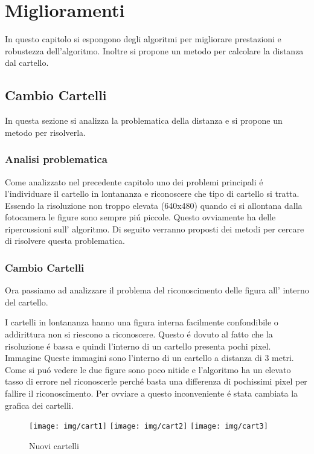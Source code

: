 \chapter{Miglioramenti}

In questo capitolo si espongono degli algoritmi per migliorare prestazioni e robustezza dell'algoritmo. Inoltre si propone un metodo per calcolare la distanza dal cartello.

\section{Cambio Cartelli}

	In questa sezione si analizza la problematica della distanza e si propone un metodo per risolverla.

	\subsection{Analisi problematica}
		Come analizzato nel precedente capitolo uno dei problemi principali \'e l'individuare il cartello in lontananza e riconoscere che tipo di cartello si tratta.
		Essendo la risoluzione non troppo elevata (640x480) quando ci si allontana dalla fotocamera le figure sono sempre pi\'u piccole. Questo ovviamente ha delle ripercussioni sull' algoritmo.
		Di seguito verranno proposti dei metodi per cercare di risolvere questa problematica.


	\subsection{Cambio Cartelli}
		Ora passiamo ad analizzare il problema del riconoscimento delle figura all' interno del cartello.

		I cartelli in lontananza hanno una figura interna facilmente confondibile o addirittura non si riescono a riconoscere. Questo \'e dovuto al fatto che la risoluzione \'e bassa e quindi l'interno di un cartello presenta pochi pixel.
		Immagine
		Queste immagini sono l'interno di un cartello a distanza di 3 metri. Come si pu\'o vedere le due figure sono poco nitide e l'algoritmo ha un elevato tasso di errore nel riconoscerle perch\'e basta una differenza di pochissimi pixel per fallire il riconoscimento.
		Per ovviare a questo inconveniente \'e stata cambiata la grafica dei cartelli.
		\begin{figure}[!ht]
			\centering
			\texttt{[image: img/cart1]}
			\texttt{[image: img/cart2]}
			\texttt{[image: img/cart3]}
			\caption{Nuovi cartelli}
		\end{figure}

